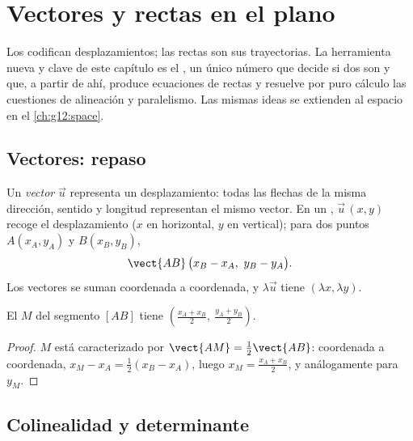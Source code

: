 \chapter{Vectores y rectas en el plano}\label{ch:g11:vect}

Los  codifican desplazamientos; las rectas son sus trayectorias. La
herramienta nueva y clave de este capítulo es el \emph{}, un
único número que decide si dos  son  y que, a partir de
ahí, produce ecuaciones de rectas y resuelve por puro cálculo las
cuestiones de alineación y paralelismo. Las mismas ideas se extienden al
espacio en el \cref{ch:g12:space}.

\section{Vectores: repaso}

\begin{definition}\label{def:g11:vect:vector}
Un \emph{vector} $\vec u$ representa un desplazamiento:
todas las flechas de la misma dirección, sentido y longitud representan el
mismo vector. En un , $\vec u\,(x, y)$ recoge el
desplazamiento ($x$ en horizontal, $y$ en vertical); para dos puntos
$A(x_A, y_A)$ y $B(x_B, y_B)$,
\[
\vect{AB}\,\bigl(x_B - x_A,\ y_B - y_A\bigr).
\]
Los vectores se suman coordenada a coordenada, y $\lambda\vec u$ tiene
 $(\lambda x, \lambda y)$.
\end{definition}

\begin{proposition}\label{prop:g11:vect:midpoint}
El  $M$ del segmento $[AB]$ tiene 
$\left(\frac{x_A + x_B}{2},\ \frac{y_A + y_B}{2}\right)$.
\end{proposition}

\begin{proof}
$M$ está caracterizado por $\vect{AM} = \frac12\vect{AB}$: coordenada a
coordenada, $x_M - x_A = \frac12(x_B - x_A)$, luego
$x_M = \frac{x_A + x_B}{2}$, y análogamente para $y_M$.
\end{proof}

\section{Colinealidad y determinante}

